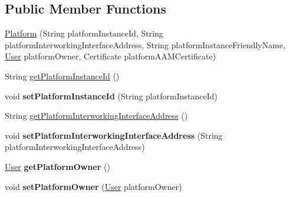 \subsection*{Public Member Functions}
\begin{DoxyCompactItemize}
\item 
\hyperlink{classeu_1_1h2020_1_1symbiote_1_1security_1_1commons_1_1Platform_aa19175370c312a3e4409dee595e6b71e}{Platform} (String platform\+Instance\+Id, String platform\+Interworking\+Interface\+Address, String platform\+Instance\+Friendly\+Name, \hyperlink{classeu_1_1h2020_1_1symbiote_1_1security_1_1commons_1_1User}{User} platform\+Owner, Certificate platform\+A\+A\+M\+Certificate)
\item 
String \hyperlink{classeu_1_1h2020_1_1symbiote_1_1security_1_1commons_1_1Platform_ad7ca1891c4c5dc3b52d7fae5138d4e5f}{get\+Platform\+Instance\+Id} ()
\item 
void {\bfseries set\+Platform\+Instance\+Id} (String platform\+Instance\+Id)\hypertarget{classeu_1_1h2020_1_1symbiote_1_1security_1_1commons_1_1Platform_af988ed82685b25a179f7bc7a752041ec}{}\label{classeu_1_1h2020_1_1symbiote_1_1security_1_1commons_1_1Platform_af988ed82685b25a179f7bc7a752041ec}

\item 
String \hyperlink{classeu_1_1h2020_1_1symbiote_1_1security_1_1commons_1_1Platform_acc15f90ae459455e3af02f99fbde1ea0}{get\+Platform\+Interworking\+Interface\+Address} ()
\item 
void {\bfseries set\+Platform\+Interworking\+Interface\+Address} (String platform\+Interworking\+Interface\+Address)\hypertarget{classeu_1_1h2020_1_1symbiote_1_1security_1_1commons_1_1Platform_a623e866018fcb9145cf0405de8811ac4}{}\label{classeu_1_1h2020_1_1symbiote_1_1security_1_1commons_1_1Platform_a623e866018fcb9145cf0405de8811ac4}

\item 
\hyperlink{classeu_1_1h2020_1_1symbiote_1_1security_1_1commons_1_1User}{User} {\bfseries get\+Platform\+Owner} ()\hypertarget{classeu_1_1h2020_1_1symbiote_1_1security_1_1commons_1_1Platform_a91649331565298d271f39a214c802198}{}\label{classeu_1_1h2020_1_1symbiote_1_1security_1_1commons_1_1Platform_a91649331565298d271f39a214c802198}

\item 
void {\bfseries set\+Platform\+Owner} (\hyperlink{classeu_1_1h2020_1_1symbiote_1_1security_1_1commons_1_1User}{User} platform\+Owner)\hypertarget{classeu_1_1h2020_1_1symbiote_1_1security_1_1commons_1_1Platform_a6b186d1add3bd4ea1685b7b004e01ee6}{}\label{classeu_1_1h2020_1_1symbiote_1_1security_1_1commons_1_1Platform_a6b186d1add3bd4ea1685b7b004e01ee6}


\end{DoxyCompactItemize}
